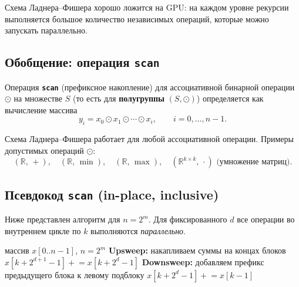 \begin{Remark}{}{}
	Схема Ладнера–Фишера хорошо ложится на GPU: на каждом уровне рекурсии выполняется большое количество независимых операций, которые можно запускать параллельно.
\end{Remark}

\subsection{Обобщение: операция \texttt{scan}}

\begin{Definition}{}{}
	Операция \textbf{\texttt{scan}} (префиксное накопление) для ассоциативной бинарной операции $\odot$ на множестве $S$ (то есть для \textbf{полугруппы} $(S, \odot)$) определяется как вычисление массива
	\[
	y_i = x_0 \odot x_1 \odot \cdots \odot x_i, \qquad i = 0, \dots, n-1.
	\]
\end{Definition}

Схема Ладнера–Фишера работает для любой ассоциативной операции. Примеры допустимых операций $\odot$:
\[
(\mathbb{R},\, +), \quad
(\mathbb{R},\, \min), \quad
(\mathbb{R},\, \max), \quad
(\mathbb{R}^{k \times k},\, \cdot) \text{ (умножение матриц)}.
\]

\subsection{Псевдокод \texttt{scan} (in-place, inclusive)}

Ниже представлен алгоритм для $n = 2^m$. Для фиксированного $d$ все операции во внутреннем цикле по $k$ выполняются \emph{параллельно}.

\begin{algorithm}[H]
	\caption{\texttt{scan} (in-place, inclusive)}
	\begin{algorithmic}[1]
		\Require массив $x[0..n-1]$, $n = 2^m$
		\Statex \textbf{Upsweep:} накапливаем суммы на концах блоков
		\State $x[k + 2^{d+1} - 1] \mathrel{+}= x[k + 2^d - 1]$
		\EndFor
		\EndFor
		\Statex \textbf{Downsweep:} добавляем префикс предыдущего блока к левому подблоку
		\State $x[k + 2^d - 1] \mathrel{+}= x[k - 1]$
		\EndIf
		\EndFor
		\EndFor
	\end{algorithmic}
\end{algorithm}

